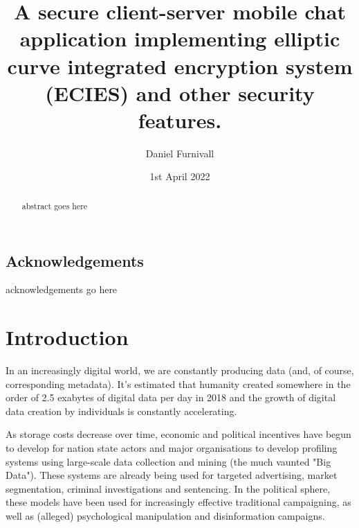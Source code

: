 \documentclass{mproj}
\begin{document}

\title{A secure client-server mobile chat application implementing elliptic curve integrated encryption system (ECIES) and other security features.}
\author{Daniel Furnivall}
\date{1st April 2022}
\maketitle

\begin{abstract}
abstract goes here
\end{abstract}

\educationalconsent


\newpage
\section*{Acknowledgements}

acknowledgements go here

\tableofcontents


\chapter{Introduction}\label{intro} \setcounter{page}{1} 

In an increasingly digital world, we are constantly producing data (and, of course, corresponding metadata). It's estimated that humanity created somewhere in the order of 2.5 exabytes of digital data per day in 2018\cite{baeza2022attention} and the growth of digital data creation by individuals is constantly accelerating. 

As storage costs decrease over time\cite{walter2005kryder}, economic and political incentives have begun to develop for nation state actors and major organisations to develop profiling systems using large-scale data collection and mining (the much vaunted "Big Data"). These systems are already being used for targeted advertising\cite{farahat2012effective}, market segmentation\cite{pantelis2013understanding}, criminal investigations\cite{zawoad2015digital} and sentencing\cite{simmons2017big}. In the political sphere, these models have been used for increasingly effective traditional campaigning, \cite{kreiss2019arbiters} as well as (alleged) psychological manipulation\cite{berghel2018malice} and disinformation\cite{stocker2019facebook} campaigns.
\end{document}
